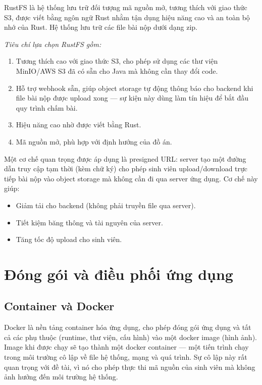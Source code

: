 \documentclass[../BTL.tex]{subfiles}
\begin{document}
RustFS là hệ thống lưu trữ đối tượng mã nguồn mở, tương thích với giao thức S3, được viết bằng ngôn ngữ Rust nhằm tận dụng hiệu năng cao và an toàn bộ nhớ của Rust. Hệ thống lưu trữ các file bài nộp dưới dạng zip.

\textit{Tiêu chí lựa chọn RustFS gồm:}
\begin{enumerate}
    \item Tương thích cao với giao thức S3, cho phép sử dụng các thư viện MinIO/AWS S3 đã có sẵn cho Java mà không cần thay đổi code.
    \item Hỗ trợ webhook sẵn, giúp object storage tự động thông báo cho backend khi file bài nộp được upload xong — sự kiện này dùng làm tín hiệu để bắt đầu quy trình chấm bài.
    \item Hiệu năng cao nhờ được viết bằng Rust.
    \item Mã nguồn mở, phù hợp với định hướng của đồ án.
\end{enumerate}

Một cơ chế quan trọng được áp dụng là presigned URL: server tạo một đường dẫn truy cập tạm thời (kèm chữ ký) cho phép sinh viên upload/download trực tiếp bài nộp vào object storage mà không cần đi qua server ứng dụng. Cơ chế này giúp:
\begin{itemize}
    \item Giảm tải cho backend (không phải truyền file qua server).
    \item Tiết kiệm băng thông và tài nguyên của server.
    \item Tăng tốc độ upload cho sinh viên.
\end{itemize}

\section{Đóng gói và điều phối ứng dụng}
\label{section:2.7}

\subsection{Container và Docker}
\label{section:2.7.1}

Docker là nền tảng container hóa ứng dụng, cho phép đóng gói ứng dụng và tất cả các phụ thuộc (runtime, thư viện, cấu hình) vào một docker image (hình ảnh). Image khi được chạy sẽ tạo thành một docker container --- một tiến trình chạy trong môi trường cô lập về file hệ thống, mạng và quá trình. Sự cô lập này rất quan trọng với đề tài, vì nó cho phép thực thi mã nguồn của sinh viên mà không ảnh hưởng đến môi trường hệ thống.
\end{document}
